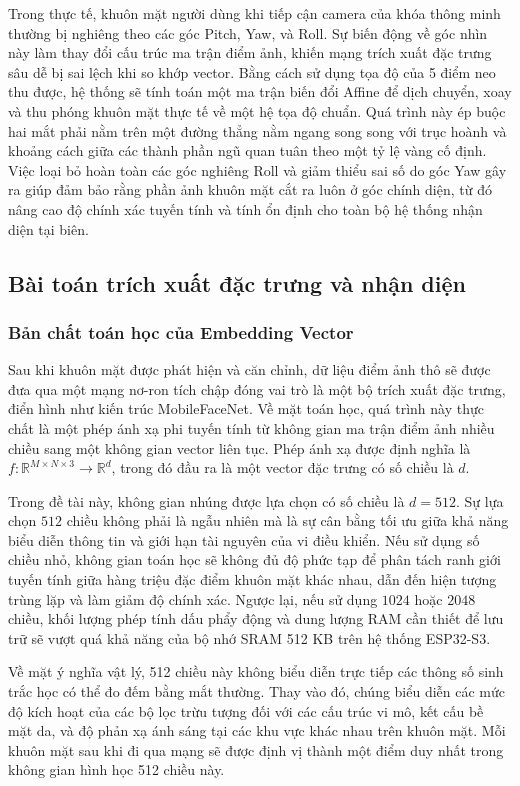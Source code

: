 Trong thực tế, khuôn mặt người dùng khi tiếp cận camera của khóa thông minh thường bị nghiêng theo các góc Pitch, Yaw, và Roll. Sự biến động về góc nhìn này làm thay đổi cấu trúc ma trận điểm ảnh, khiến mạng trích xuất đặc trưng sâu dễ bị sai lệch khi so khớp vector. Bằng cách sử dụng tọa độ của 5 điểm neo thu được, hệ thống sẽ tính toán một ma trận biến đổi Affine để dịch chuyển, xoay và thu phóng khuôn mặt thực tế về một hệ tọa độ chuẩn. Quá trình này ép buộc hai mắt phải nằm trên một đường thẳng nằm ngang song song với trục hoành và khoảng cách giữa các thành phần ngũ quan tuân theo một tỷ lệ vàng cố định. Việc loại bỏ hoàn toàn các góc nghiêng Roll và giảm thiểu sai số do góc Yaw gây ra giúp đảm bảo rằng phần ảnh khuôn mặt cắt ra luôn ở góc chính diện, từ đó nâng cao độ chính xác tuyến tính và tính ổn định cho toàn bộ hệ thống nhận diện tại biên.

\subsection{Bài toán trích xuất đặc trưng và nhận diện}

\subsubsection{Bản chất toán học của Embedding Vector}
Sau khi khuôn mặt được phát hiện và căn chỉnh, dữ liệu điểm ảnh thô sẽ được đưa qua một mạng nơ-ron tích chập đóng vai trò là một bộ trích xuất đặc trưng, điển hình như kiến trúc MobileFaceNet. Về mặt toán học, quá trình này thực chất là một phép ánh xạ phi tuyến tính từ không gian ma trận điểm ảnh nhiều chiều sang một không gian vector liên tục. Phép ánh xạ được định nghĩa là $f: \mathbb{R}^{M \times N \times 3} \rightarrow \mathbb{R}^d$, trong đó đầu ra là một vector đặc trưng có số chiều là $d$.

Trong đề tài này, không gian nhúng được lựa chọn có số chiều là $d = 512$. Sự lựa chọn $512$ chiều không phải là ngẫu nhiên mà là sự cân bằng tối ưu giữa khả năng biểu diễn thông tin và giới hạn tài nguyên của vi điều khiển. Nếu sử dụng số chiều nhỏ, không gian toán học sẽ không đủ độ phức tạp để phân tách ranh giới tuyến tính giữa hàng triệu đặc điểm khuôn mặt khác nhau, dẫn đến hiện tượng trùng lặp và làm giảm độ chính xác. Ngược lại, nếu sử dụng $1024$ hoặc $2048$ chiều, khối lượng phép tính dấu phẩy động và dung lượng RAM cần thiết để lưu trữ sẽ vượt quá khả năng của bộ nhớ SRAM 512 KB trên hệ thống ESP32-S3.

Về mặt ý nghĩa vật lý, 512 chiều này không biểu diễn trực tiếp các thông số sinh trắc học có thể đo đếm bằng mắt thường. Thay vào đó, chúng biểu diễn các mức độ kích hoạt của các bộ lọc trừu tượng đối với các cấu trúc vi mô, kết cấu bề mặt da, và độ phản xạ ánh sáng tại các khu vực khác nhau trên khuôn mặt. Mỗi khuôn mặt sau khi đi qua mạng sẽ được định vị thành một điểm duy nhất trong không gian hình học 512 chiều này.

